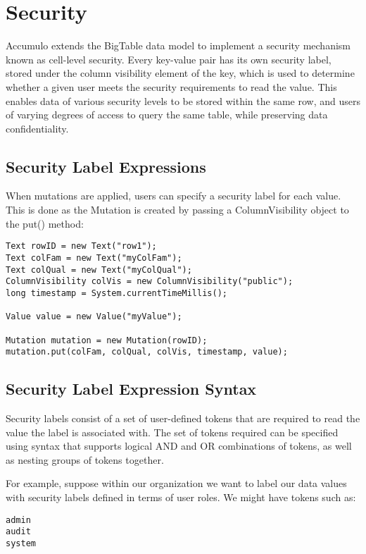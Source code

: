 \chapter{Security}

Accumulo extends the BigTable data model to implement a security mechanism
known as cell-level security. Every key-value pair has its own security label, stored
under the column visibility element of the key, which is used to determine whether
a given user meets the security requirements to read the value. This enables data of
various security levels to be stored within the same row, and users of varying
degrees of access to query the same table, while preserving data confidentiality.

\section{Security Label Expressions}

When mutations are applied, users can specify a security label for each value. This is
done as the Mutation is created by passing a ColumnVisibility object to the put()
method:

\small
\begin{verbatim}
Text rowID = new Text("row1");
Text colFam = new Text("myColFam");
Text colQual = new Text("myColQual");
ColumnVisibility colVis = new ColumnVisibility("public");
long timestamp = System.currentTimeMillis();

Value value = new Value("myValue");

Mutation mutation = new Mutation(rowID);
mutation.put(colFam, colQual, colVis, timestamp, value);
\end{verbatim}
\normalsize

\section{Security Label Expression Syntax}

Security labels consist of a set of user-defined tokens that are required to read the
value the label is associated with. The set of tokens required can be specified using
syntax that supports logical AND and OR combinations of tokens, as well as nesting
groups of tokens together.

For example, suppose within our organization we want to label our data values with
security labels defined in terms of user roles. We might have tokens such as:

\small
\begin{verbatim}
admin
audit
system
\end{verbatim}
\normalsize


